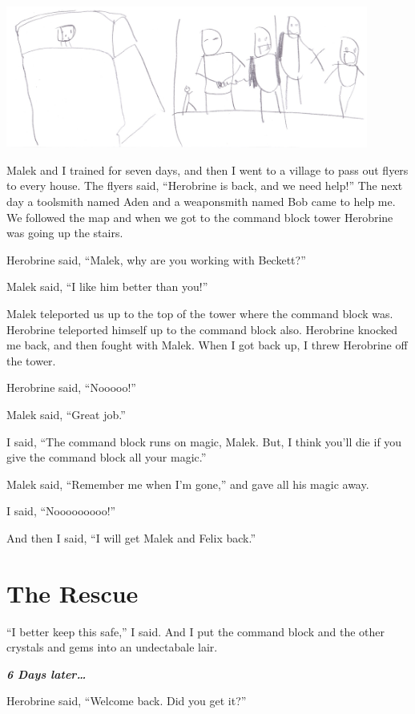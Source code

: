 \documentclass[12pt,oneside]{krantz}
\begin{document}
\includegraphics[width=4.6875in,height=\textheight]{img/nooooo.jpg}

Malek and I trained for seven days, and then I went to a village to pass
out flyers to every house. The flyers said, ``Herobrine is back, and we
need help!'' The next day a toolsmith named Aden and a weaponsmith named
Bob came to help me. We followed the map and when we got to the command
block tower Herobrine was going up the stairs.

Herobrine said, ``Malek, why are you working with Beckett?''

Malek said, ``I like him better than you!''

Malek teleported us up to the top of the tower where the command block
was. Herobrine teleported himself up to the command block also.
Herobrine knocked me back, and then fought with Malek. When I got back
up, I threw Herobrine off the tower.

Herobrine said, ``Nooooo!''

Malek said, ``Great job.''

I said, ``The command block runs on magic, Malek. But, I think you'll
die if you give the command block all your magic.''

Malek said, ``Remember me when I'm gone,'' and gave all his magic away.

I said, ``Nooooooooo!''

And then I said, ``I will get Malek and Felix back.''

\hypertarget{the-rescue}{%
\chapter{The Rescue}\label{the-rescue}}

``I better keep this safe,'' I said. And I put the command block and the
other crystals and gems into an undectabale lair.

\textbf{\emph{6 Days later\ldots{}}}

Herobrine said, ``Welcome back. Did you get it?''
\end{document}
